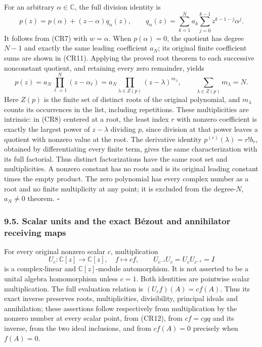 \documentclass[
  11pt,
]{article}
\begin{document}
For an arbitrary \(\alpha\in\mathbb C\), the full division identity is
\[
 p(z)=p(\alpha)+(z-\alpha)q_\alpha(z),\qquad
 q_\alpha(z)=\sum_{k=1}^N a_k
                    \sum_{j=0}^{k-1}z^{k-1-j}\alpha^j .         \tag{CR11}
\] It follows from (CR7) with \(w=\alpha\). When \(p(\alpha)=0\), the
quotient has degree \(N-1\) and exactly the same leading coefficient
\(a_N\); its original finite coefficient sums are shown in (CR11).
Applying the proved root theorem to each successive nonconstant
quotient, and retaining every zero remainder, yields \[
 p(z)=a_N\prod_{\ell=1}^N(z-\alpha_\ell)
      =a_N\prod_{\lambda\in Z(p)}(z-\lambda)^{m_\lambda},
 \qquad \sum_{\lambda\in Z(p)}m_\lambda=N .                    \tag{CR12}
\] Here \(Z(p)\) is the finite set of distinct roots of the original
polynomial, and \(m_\lambda\) counts its occurrences in the list,
including repetitions. These multiplicities are intrinsic: in (CR8)
centered at a root, the least index \(r\) with nonzero coefficient is
exactly the largest power of \(z-\lambda\) dividing \(p\), since
division at that power leaves a quotient with nonzero value at the root.
The derivative identity \(p^{(r)}(\lambda)=r!b_r\), obtained by
differentiating every finite term, gives the same characterization with
its full factorial. Thus distinct factorizations have the same root set
and multiplicities. A nonzero constant has no roots and is its original
leading constant times the empty product. The zero polynomial has every
complex number as a root and no finite multiplicity at any point; it is
excluded from the degree-\(N\), \(a_N\ne0\) theorem. \(\square\)

\subsubsection{9.5. Scalar units and the exact Bézout and annihilator
receiving
maps}\label{scalar-units-and-the-exact-buxe9zout-and-annihilator-receiving-maps}

For every original nonzero scalar \(c\), multiplication \[
 U_c:\mathbb C[z]\longrightarrow\mathbb C[z],\quad f\longmapsto cf,
 \qquad U_{c^{-1}}U_c=U_cU_{c^{-1}}=I                         \tag{CR13}
\] is a complex-linear and \(\mathbb C[z]\)-module automorphism. It is
not asserted to be a unital algebra homomorphism unless \(c=1\). Both
identities are pointwise scalar multiplication. The full evaluation
relation is \((U_cf)(A)=c f(A)\). Thus its exact inverse preserves
roots, multiplicities, divisibility, principal ideals and annihilation;
these assertions follow respectively from multiplication by the nonzero
number at every scalar point, from (CR12), from \(cf=cgq\) and its
inverse, from the two ideal inclusions, and from \(cf(A)=0\) precisely
when \(f(A)=0\).
\end{document}
